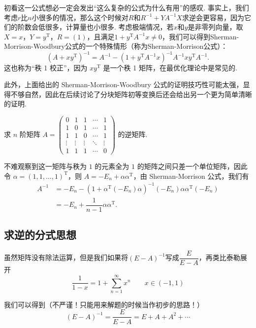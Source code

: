 初看这一公式想必一定会发出``这么复杂的公式为什么有用''的感叹. 事实上，我们考虑$r$比$n$小很多的情况，那么这个时候对$R$和$R^{-1}+YA^{-1}X$求逆会更容易，因为它们的阶数会低很多，计算量也小很多. 考虑极端情况，若$x$和$y$是非零列向量，取$X=x$，$Y=y^\mathrm{T}$，$R=(1)$，且满足$1+y^\mathrm{T}A^{-1}x\neq 0$，我们可以得到Sherman-Morrison-Woodbury公式的一个特殊情形（称为Sherman-Morrison公式）：
\[(A+xy^\mathrm{T})^{-1}=A^{-1}-(1+y^\mathrm{T}A^{-1}x)^{-1}A^{-1}xy^\mathrm{T}A^{-1}.\]
这也称为``秩 1 校正''，因为 $xy^\mathrm{T}$ 是一个秩 1 矩阵，在最优化理论中是常见的.

此外，上面给出的 Sherman-Morrison-Woodbury 公式的证明技巧性可能太强，显得不够自然，因此在后续讨论了分块矩阵初等变换后还会给出另一个更为简单清晰的证明.

\begin{example}{}{}
    求 $n$ 阶矩阵 $A = \begin{pmatrix}
        0 & 1 & 1 & \cdots & 1 \\
        1 & 0 & 1 & \cdots & 1 \\
        1 & 1 & 0 & \cdots & 1 \\
        \vdots & \vdots & \vdots & \ddots & \vdots \\
        1 & 1 & 1 & \cdots & 0
    \end{pmatrix}$ 的逆矩阵.
\end{example}
\begin{solution}
    不难观察到这一矩阵与秩为 $1$ 的元素全为 $1$ 的矩阵之间只差一个单位矩阵，因此令 $\alpha = (1,1,\ldots,1)^\mathrm{T}$，则 $A = -E_n + \alpha\alpha^\mathrm{T}$，由 Sherman-Morrison 公式，我们有
    \begin{align*}
        A^{-1} &= -E_n - (1 + \alpha^\mathrm{T}(-E_n)\alpha)^{-1}(-E_n)\alpha\alpha^\mathrm{T}(-E_n) \\
                &= -E_n + \dfrac{1}{n-1}\alpha\alpha^\mathrm{T}.
    \end{align*}
\end{solution}

\subsection{求逆的分式思想}

虽然矩阵没有除法运算，但是我们如果将$(E-A)^{-1}$写成$\dfrac{E}{E-A}$，再类比泰勒展开
\[\frac{1}{1-x}=1+\sum\limits_{n=1}^\infty x^n \qquad x\in (-1,1)\]

我们可以得到（不严谨！只能用来解题的时候当作初步的思路！）
\[(E-A)^{-1}=\frac{E}{E-A}=E+A+A^2+\cdots\]

